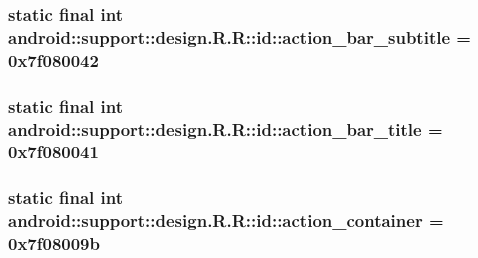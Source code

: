 \hypertarget{classandroid_1_1support_1_1design_1_1_r_1_1id_2d3762bdbafda3ae0633985dbfb6d6bd}{
\subsubsection[{action\_\-bar\_\-subtitle}]{\setlength{\rightskip}{0pt plus 5cm}static final int android::support::design.R.R::id::action\_\-bar\_\-subtitle = 0x7f080042}}
\label{classandroid_1_1support_1_1design_1_1_r_1_1id_2d3762bdbafda3ae0633985dbfb6d6bd}


\hypertarget{classandroid_1_1support_1_1design_1_1_r_1_1id_b84441897ac6e9829361490f70a8425f}{
\subsubsection[{action\_\-bar\_\-title}]{\setlength{\rightskip}{0pt plus 5cm}static final int android::support::design.R.R::id::action\_\-bar\_\-title = 0x7f080041}}
\label{classandroid_1_1support_1_1design_1_1_r_1_1id_b84441897ac6e9829361490f70a8425f}


\hypertarget{classandroid_1_1support_1_1design_1_1_r_1_1id_33d7ae788e0e123ae5e145738a2bab7f}{
\subsubsection[{action\_\-container}]{\setlength{\rightskip}{0pt plus 5cm}static final int android::support::design.R.R::id::action\_\-container = 0x7f08009b}}
\label{classandroid_1_1support_1_1design_1_1_r_1_1id_33d7ae788e0e123ae5e145738a2bab7f}


